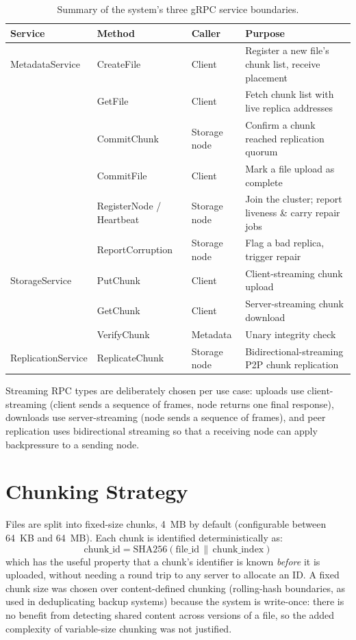 \documentclass[12pt,a4paper]{report}
\begin{document}
\begin{table}[h]
\centering
\small
\begin{tabular}{p{2.7cm}p{2cm}p{2cm}p{6.5cm}}
\toprule
\textbf{Service} & \textbf{Method} & \textbf{Caller} & \textbf{Purpose} \\
\midrule
MetadataService & CreateFile & Client & Register a new file's chunk list, receive placement \\
 & GetFile & Client & Fetch chunk list with live replica addresses \\
 & CommitChunk & Storage node & Confirm a chunk reached replication quorum \\
 & CommitFile & Client & Mark a file upload as complete \\
 & RegisterNode / Heartbeat & Storage node & Join the cluster; report liveness \& carry repair jobs \\
 & ReportCorruption & Storage node & Flag a bad replica, trigger repair \\
\midrule
StorageService & PutChunk & Client & Client-streaming chunk upload \\
 & GetChunk & Client & Server-streaming chunk download \\
 & VerifyChunk & Metadata & Unary integrity check \\
\midrule
ReplicationService & ReplicateChunk & Storage node & Bidirectional-streaming P2P chunk replication \\
\bottomrule
\end{tabular}
\caption{Summary of the system's three gRPC service boundaries.}
\label{tab:grpc}
\end{table}

Streaming RPC types are deliberately chosen per use case: uploads use client-streaming (client sends a sequence of frames, node returns one final response), downloads use server-streaming (node sends a sequence of frames), and peer replication uses bidirectional streaming so that a receiving node can apply backpressure to a sending node.

\section{Chunking Strategy}

Files are split into fixed-size chunks, 4~MB by default (configurable between 64~KB and 64~MB). Each chunk is identified deterministically as:
\[
\text{chunk\_id} = \text{SHA256}(\text{file\_id} \,\|\, \text{chunk\_index})
\]
which has the useful property that a chunk's identifier is known \emph{before} it is uploaded, without needing a round trip to any server to allocate an ID. A fixed chunk size was chosen over content-defined chunking (rolling-hash boundaries, as used in deduplicating backup systems) because the system is write-once: there is no benefit from detecting shared content across versions of a file, so the added complexity of variable-size chunking was not justified.
\end{document}
